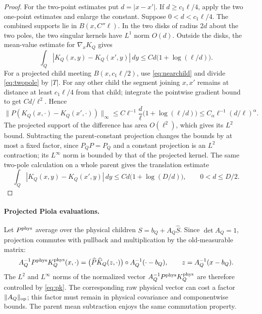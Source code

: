 \documentclass[11pt]{article}
\theoremstyle{definition}
\theoremstyle{remark}
\numberwithin{equation}{section}
\begin{document}
\begin{proof}
For the two-point estimates put $d=|x-x'|$. If $d\ge c_1\ell/4$,
apply the two one-point estimates and enlarge the constant.
Suppose $0<d<c_1\ell/4$. The combined supports lie in
$B(x,C''\ell)$. In the two disks of radius $2d$ about the two
poles, the two singular kernels have $L^1$ norm $O(d)$.
Outside the disks, the mean-value estimate for
$\nabla_xK_Q$ gives
\begin{equation}\label{eq:twopole}
 \int_Q|K_Q(x,y)-K_Q(x',y)|\,dy
 \le Cd\bigl(1+\log(\ell/d)\bigr).
\end{equation}
For a projected child meeting $B(x,c_1\ell/2)$, use
\eqref{eq:nearchild} and divide \eqref{eq:twopole} by $|T|$.
For any other child the segment joining $x,x'$ remains at
distance at least $c_1\ell/4$ from that child; integrate the
pointwise gradient bound to get $Cd/\ell^2$.
Hence
\[
 \|P(K_Q(x,\cdot)-K_Q(x',\cdot))\|_\infty
 \le C\ell^{-1}\frac d\ell
       \bigl(1+\log(\ell/d)\bigr)
 \le C_\alpha\ell^{-1}(d/\ell)^\alpha.
\]
The projected support of the difference has area $O(\ell^2)$,
which gives its $L^2$ bound. Subtracting the parent-constant
projection changes the bounds by at most a fixed factor, since
$P_QP=P_Q$ and a constant projection is an $L^2$ contraction;
its $L^\infty$ norm is bounded by that of the projected kernel.
The same two-pole calculation on a whole parent gives the
translation estimate
\begin{equation}\label{eq:L1mod}
 \int_Q|K_Q(x,y)-K_Q(x',y)|\,dy
 \le Cd\bigl(1+\log(D/d)\bigr),\qquad 0<d\le D/2.
\end{equation}
\end{proof}

\paragraph{Projected Piola evaluations.}
Let $P^{\rm phys}$ average over the physical children
$S=b_Q+A_Q\widehat S$. Since $\det A_Q=1$, projection commutes
with pullback and multiplication by the old-measurable matrix:
\begin{equation}\label{eq:projectedpiola}
 A_Q^{-1}P^{\rm phys}K_Q^{\rm phys}(x,\cdot)
 =\bigl(\widehat P\widehat K_Q(z,\cdot)\bigr)
       \circ A_Q^{-1}(\cdot-b_Q),\qquad z=A_Q^{-1}(x-b_Q).
\end{equation}
The $L^2$ and $L^\infty$ norms of the normalized vector
$A_Q^{-1}P^{\rm phys}K_Q^{\rm phys}$ are therefore controlled by
\eqref{eq:pk}. The corresponding raw physical vector can cost a factor
$\|A_Q\|_{\rm op}$; this factor must remain in physical covariance
and componentwise bounds. The parent mean subtraction enjoys the same
commutation property.
\end{document}
